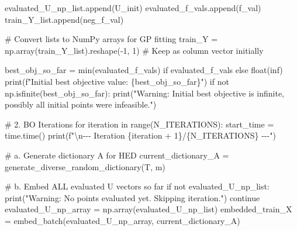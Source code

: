 \documentclass[
  letterpaper,
  DIV=11,
  numbers=noendperiod]{scrartcl}
\newenvironment{Shaded}{\begin{snugshade}}{\end{snugshade}}
\newcommand{\BuiltInTok}[1]{\textcolor[rgb]{0.00,0.23,0.31}{#1}}
\newcommand{\CharTok}[1]{\textcolor[rgb]{0.13,0.47,0.30}{#1}}
\newcommand{\CommentTok}[1]{\textcolor[rgb]{0.37,0.37,0.37}{#1}}
\newcommand{\ControlFlowTok}[1]{\textcolor[rgb]{0.00,0.23,0.31}{#1}}
\newcommand{\DecValTok}[1]{\textcolor[rgb]{0.68,0.00,0.00}{#1}}
\newcommand{\KeywordTok}[1]{\textcolor[rgb]{0.00,0.23,0.31}{#1}}
\newcommand{\NormalTok}[1]{\textcolor[rgb]{0.00,0.23,0.31}{#1}}
\newcommand{\OperatorTok}[1]{\textcolor[rgb]{0.37,0.37,0.37}{#1}}
\newcommand{\SpecialCharTok}[1]{\textcolor[rgb]{0.37,0.37,0.37}{#1}}
\newcommand{\SpecialStringTok}[1]{\textcolor[rgb]{0.13,0.47,0.30}{#1}}
\newcommand{\StringTok}[1]{\textcolor[rgb]{0.13,0.47,0.30}{#1}}
\begin{document}
\begin{Shaded}
\begin{Highlighting}[]
\NormalTok{    evaluated\_U\_np\_list.append(U\_init)}
\NormalTok{    evaluated\_f\_vals.append(f\_val)}
\NormalTok{    train\_Y\_list.append(neg\_f\_val)}

\CommentTok{\# Convert lists to NumPy arrays for GP fitting}
\NormalTok{train\_Y }\OperatorTok{=}\NormalTok{ np.array(train\_Y\_list).reshape(}\OperatorTok{{-}}\DecValTok{1}\NormalTok{, }\DecValTok{1}\NormalTok{) }\CommentTok{\# Keep as column vector initially}

\NormalTok{best\_obj\_so\_far }\OperatorTok{=} \BuiltInTok{min}\NormalTok{(evaluated\_f\_vals) }\ControlFlowTok{if}\NormalTok{ evaluated\_f\_vals }\ControlFlowTok{else} \BuiltInTok{float}\NormalTok{(}\StringTok{\textquotesingle{}inf\textquotesingle{}}\NormalTok{)}
\BuiltInTok{print}\NormalTok{(}\SpecialStringTok{f"Initial best objective value: }\SpecialCharTok{\{}\NormalTok{best\_obj\_so\_far}\SpecialCharTok{\}}\SpecialStringTok{"}\NormalTok{)}
\ControlFlowTok{if} \KeywordTok{not}\NormalTok{ np.isfinite(best\_obj\_so\_far):}
     \BuiltInTok{print}\NormalTok{(}\StringTok{"Warning: Initial best objective is infinite, possibly all initial points were infeasible."}\NormalTok{)}


\CommentTok{\# 2. BO Iterations}
\ControlFlowTok{for}\NormalTok{ iteration }\KeywordTok{in} \BuiltInTok{range}\NormalTok{(N\_ITERATIONS):}
\NormalTok{    start\_time }\OperatorTok{=}\NormalTok{ time.time()}
    \BuiltInTok{print}\NormalTok{(}\SpecialStringTok{f"}\CharTok{\textbackslash{}n}\SpecialStringTok{{-}{-}{-} Iteration }\SpecialCharTok{\{}\NormalTok{iteration }\OperatorTok{+} \DecValTok{1}\SpecialCharTok{\}}\SpecialStringTok{/}\SpecialCharTok{\{}\NormalTok{N\_ITERATIONS}\SpecialCharTok{\}}\SpecialStringTok{ {-}{-}{-}"}\NormalTok{)}

    \CommentTok{\# a. Generate dictionary A for HED}
\NormalTok{    current\_dictionary\_A }\OperatorTok{=}\NormalTok{ generate\_diverse\_random\_dictionary(T, m)}

    \CommentTok{\# b. Embed ALL evaluated U vectors so far}
    \ControlFlowTok{if} \KeywordTok{not}\NormalTok{ evaluated\_U\_np\_list:}
        \BuiltInTok{print}\NormalTok{(}\StringTok{"Warning: No points evaluated yet. Skipping iteration."}\NormalTok{)}
        \ControlFlowTok{continue}
\NormalTok{    evaluated\_U\_np\_array }\OperatorTok{=}\NormalTok{ np.array(evaluated\_U\_np\_list)}
\NormalTok{    embedded\_train\_X }\OperatorTok{=}\NormalTok{ embed\_batch(evaluated\_U\_np\_array, current\_dictionary\_A)}


\end{Highlighting}
\end{Shaded}
\end{document}
